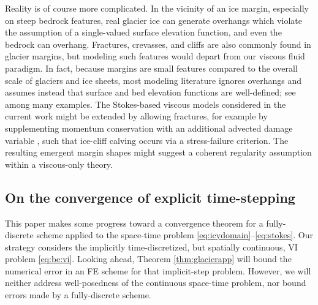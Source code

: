 \documentclass[hidelinks,onefignum,onetabnum,final]{siamart220329}  %
\begin{document}
Reality is of course more complicated.  In the vicinity of an ice margin, especially on steep bedrock features, real glacier ice can generate overhangs which violate the assumption of a single-valued surface elevation function, and even the bedrock can overhang.  Fractures, crevasses, and cliffs are also commonly found in glacier margins, but modeling such features would depart from our viscous fluid paradigm.  In fact, because margins are small features compared to the overall scale of glaciers and ice sheets, most modeling literature ignores overhangs and assumes instead that surface and bed elevation functions are well-defined; see \cite{IsaacStadlerGhattas2015,Jouvetetal2008,LofgrenAhlkronaHelanow2022,WirbelJarosch2020} among many examples.  The Stokes-based viscous models considered in the current work might be extended by allowing fractures, for example by supplementing momentum conservation with an additional advected damage variable \cite{PralongFunk2005}, such that ice-cliff calving occurs via a stress-failure criterion.  The resulting emergent margin shapes might suggest a coherent regularity assumption within a viscous-only theory.

\subsection{On the convergence of explicit time-stepping} \label{subsec:explicit}  This paper makes some progress toward a convergence theorem for a fully-discrete scheme applied to the space-time problem \eqref{eq:icydomain}--\eqref{eq:stokes}.  Our strategy considers the implicitly time-discretized, but spatially continuous, VI problem \eqref{eq:be:vi}.  Looking ahead, Theorem \ref{thm:glacierapp} will bound the numerical error in an FE scheme for that implicit-step problem.  However, we will neither address well-posedness of the continuous space-time problem, nor bound errors made by a fully-discrete scheme.
\end{document}
